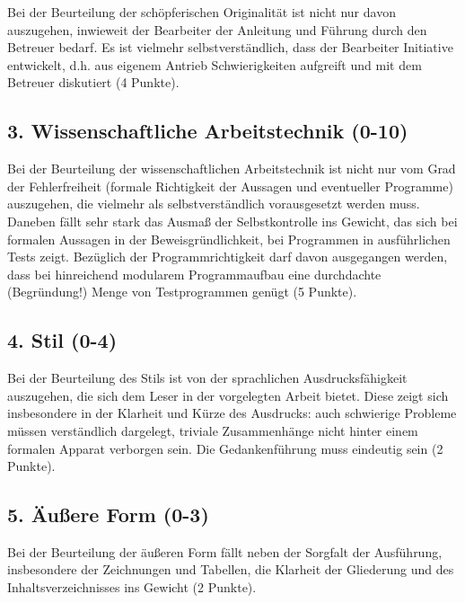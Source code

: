 \documentclass[12pt]{scrartcl}
\begin{document}
Bei der Beurteilung der schöpferischen Originalität ist nicht nur davon auszugehen, inwieweit der Bearbeiter der Anleitung und Führung durch den Betreuer bedarf. Es ist vielmehr selbstverständlich, dass der Bearbeiter Initiative entwickelt, d.h. aus eigenem Antrieb Schwierigkeiten aufgreift und mit dem Betreuer diskutiert (4 Punkte).

\subsection*{3. Wissenschaftliche Arbeitstechnik (0-10)}

Bei der Beurteilung der wissenschaftlichen Arbeitstechnik ist nicht nur vom Grad der Fehlerfreiheit (formale Richtigkeit der Aussagen und eventueller Programme) auszugehen, die vielmehr als selbstverständlich vorausgesetzt werden muss. Daneben fällt sehr stark das Ausmaß der Selbstkontrolle ins Gewicht, das sich bei formalen Aussagen in der Beweisgründlichkeit, bei Programmen in ausführlichen Tests zeigt. Bezüglich der Programmrichtigkeit darf davon ausgegangen werden, dass bei hinreichend modularem Programmaufbau eine durchdachte (Begründung!) Menge von Testprogrammen genügt (5 Punkte).

\subsection*{4. Stil (0-4)}

Bei der Beurteilung des Stils ist von der sprachlichen Ausdrucksfähigkeit auszugehen, die sich dem Leser in der vorgelegten Arbeit bietet. Diese zeigt sich insbesondere in der Klarheit und Kürze des Ausdrucks: auch schwierige Probleme müssen verständlich dargelegt, triviale Zusammenhänge nicht hinter einem formalen Apparat verborgen sein. Die Gedankenführung muss eindeutig sein (2 Punkte).

\subsection*{5. Äußere Form (0-3)}

Bei der Beurteilung der äußeren Form fällt neben der Sorgfalt der Ausführung, insbesondere der Zeichnungen und Tabellen, die Klarheit der Gliederung und des Inhaltsverzeichnisses ins Gewicht (2 Punkte).
\end{document}
